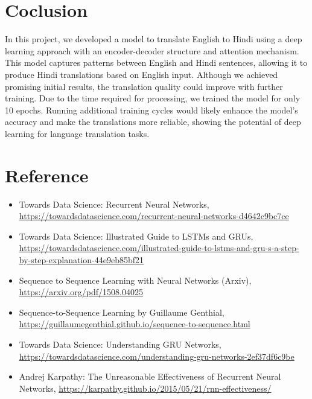\documentclass[12pt]{article}
\begin{document}
\section{Coclusion}
In this project, we developed a model to translate English to Hindi using a deep learning approach with an encoder-decoder structure and attention mechanism. This model captures patterns between English and Hindi sentences, allowing it to produce Hindi translations based on English input. Although we achieved promising initial results, the translation quality could improve with further training. Due to the time required for processing, we trained the model for only 10 epochs. Running additional training cycles would likely enhance the model’s accuracy and make the translations more reliable, showing the potential of deep learning for language translation tasks.

\section{Reference}
\begin{itemize}
    \item Towards Data Science: Recurrent Neural Networks, \url{https://towardsdatascience.com/recurrent-neural-networks-d4642c9bc7ce}
    \item Towards Data Science: Illustrated Guide to LSTMs and GRUs, \url{https://towardsdatascience.com/illustrated-guide-to-lstms-and-gru-s-a-step-by-step-explanation-44e9eb85bf21}
    \item Sequence to Sequence Learning with Neural Networks (Arxiv), \url{https://arxiv.org/pdf/1508.04025}
    \item Sequence-to-Sequence Learning by Guillaume Genthial, \url{https://guillaumegenthial.github.io/sequence-to-sequence.html}
    \item Towards Data Science: Understanding GRU Networks, \url{https://towardsdatascience.com/understanding-gru-networks-2ef37df6c9be}
    \item Andrej Karpathy: The Unreasonable Effectiveness of Recurrent Neural Networks, \url{https://karpathy.github.io/2015/05/21/rnn-effectiveness/}
\end{itemize}
\end{document}
